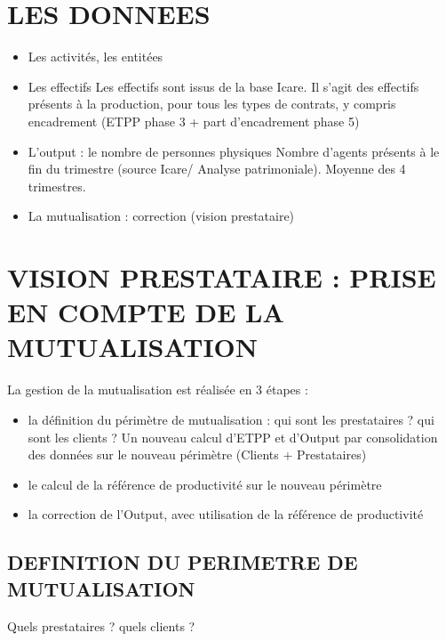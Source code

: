 \documentclass[
]{book}
\begin{document}
\hypertarget{les-donnees-13}{%
\section{LES DONNEES}\label{les-donnees-13}}

\begin{itemize}
\item
  Les activités, les entitées
\item
  Les effectifs
  Les effectifs sont issus de la base Icare.
  Il s'agit des effectifs présents à la production, pour tous les types de contrats, y compris encadrement (ETPP phase 3 + part d'encadrement phase 5)
\item
  L'output : le nombre de personnes physiques
  Nombre d'agents présents à le fin du trimestre (source Icare/ Analyse patrimoniale). Moyenne des 4 trimestres.
\item
  La mutualisation : correction (vision prestataire)
\end{itemize}

\hypertarget{vision-prestataire-prise-en-compte-de-la-mutualisation-2}{%
\section{VISION PRESTATAIRE : PRISE EN COMPTE DE LA MUTUALISATION}\label{vision-prestataire-prise-en-compte-de-la-mutualisation-2}}

La gestion de la mutualisation est réalisée en 3 étapes :

\begin{itemize}
\item
  la définition du périmètre de mutualisation : qui sont les prestataires ? qui sont les clients ? Un nouveau calcul d'ETPP et d'Output par consolidation des données sur le nouveau périmètre (Clients + Prestataires)
\item
  le calcul de la référence de productivité sur le nouveau périmètre
\item
  la correction de l'Output, avec utilisation de la référence de productivité
\end{itemize}

\hypertarget{definition-du-perimetre-de-mutualisation-2}{%
\subsection{DEFINITION DU PERIMETRE DE MUTUALISATION}\label{definition-du-perimetre-de-mutualisation-2}}

Quels prestataires ? quels clients ?
\end{document}
